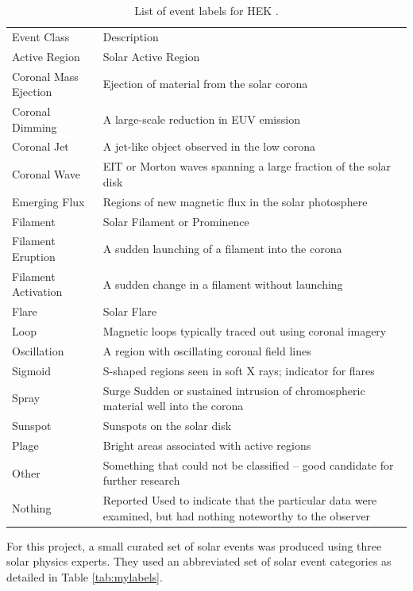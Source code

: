 \documentclass[twoside]{report}
\begin{document}
\begin{table}[ht!]
  \centering
  \begin{tabular}{||p{4cm} p{10cm}||}
    \hline
    Event Class & Description \\
    Active Region & Solar Active Region\\
    Coronal Mass Ejection & Ejection of material from the solar corona \\
    Coronal Dimming & A large-scale reduction in EUV emission \\
    Coronal Jet & A jet-like object observed in the low corona \\
    Coronal Wave & EIT or Morton waves spanning a large fraction of the solar disk \\
    Emerging Flux & Regions of new magnetic flux in the solar photosphere \\
    Filament & Solar Filament or Prominence \\
    Filament Eruption & A sudden launching of a filament into the corona  \\
    Filament Activation & A sudden change in a filament without launching \\
    Flare & Solar Flare \\
    Loop & Magnetic loops typically traced out using coronal imagery \\
    Oscillation &  A region with oscillating coronal field lines \\
    Sigmoid & S-shaped regions seen in soft X rays; indicator for flares \\
    Spray & Surge Sudden or sustained intrusion of chromospheric material well into the corona \\
    Sunspot & Sunspots on the solar disk \\
    Plage &  Bright areas associated with active regions\\
    Other & Something that could not be classified – good candidate for further research \\
    Nothing & Reported Used to indicate that the particular data were examined, but had nothing noteworthy to the observer \\
    \hline             
  \end{tabular}
  \caption{List of event labels for HEK \cite{hurlburt:2012}.}
  \label{tab:heklabels}
\end{table}

For this project, a small curated set of solar events was produced using three solar physics experts. They used an abbreviated set of solar event categories as detailed in Table \ref{tab:mylabels}.  
\end{document}

